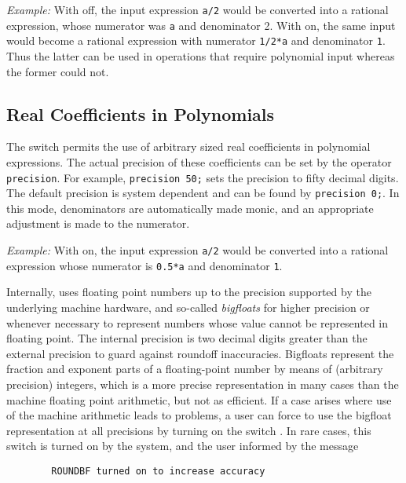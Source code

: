 \textit{Example:} With  off, the input expression \texttt{a/2}
would be converted into a rational expression, whose numerator was \texttt{a}
and denominator 2.  With  on, the same input would become a
rational expression with numerator \texttt{1/2*a} and denominator \texttt{1}.
Thus the latter can be used in operations that require polynomial input
whereas the former could not.

\subsection{Real Coefficients in Polynomials}
\hypertarget{switch:ROUNDED}{}
\hypertarget{switch:ROUNDBF}{}
\hypertarget{operator:PRECISION}{}
The switch  permits the use of arbitrary
sized real coefficients in polynomial expressions.  The actual precision
of these coefficients can be set by the operator \texttt{precision}.
 For example, \texttt{precision 50;} sets the precision to
fifty decimal digits.  The default precision is system dependent and can
be found by \texttt{precision 0;}.  In this mode, denominators are
automatically made monic, and an appropriate adjustment is made to the
numerator.

\textit{Example:} With  on, the input expression \texttt{a/2} would
be converted into a rational expression whose numerator is \texttt{0.5*a} and
denominator \texttt{1}.

Internally, {\REDUCE} uses floating point numbers up to the precision
supported by the underlying machine hardware, and so-called \emph{bigfloats} 
for higher precision or whenever necessary to represent numbers
whose value cannot be represented in floating point.  The internal
precision is two decimal digits greater than the external precision to
guard against roundoff inaccuracies.  Bigfloats represent the fraction and
exponent parts of a floating-point number by means of (arbitrary
precision) integers, which is a more precise representation in many cases
than the machine floating point arithmetic, but not as efficient.  If a
case arises where use of the machine arithmetic leads to problems, a user
can force {\REDUCE} to use the bigfloat representation at all precisions by
turning on the switch .  In rare cases,
this switch is turned on by the system, and the user informed by the
message
\begin{verbatim}
        ROUNDBF turned on to increase accuracy
\end{verbatim}

